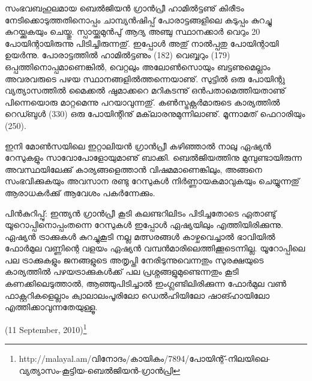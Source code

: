 സംഭവബഹുലമായ ബെല്‍ജിയന്‍ ഗ്രാന്‍പ്രീ ഹാമില്‍ട്ടണു് കിരീടം നേടിക്കൊടുത്തതിനൊപ്പം ചാമ്പ്യന്‍ഷിപ്പ് 
പോരാട്ടങ്ങളിലെ കടുപ്പം കുറച്ചു കുറയ്ക്കുകയും ചെയ്തു. സ്പായ്ക്കുമുന്‍പു് ആദ്യ അഞ്ചു സ്ഥാനക്കാര്‍ വെറും 20 പോയിന്റായിരുന്നു 
പിടിച്ചിരുന്നതു്. ഇപ്പോള്‍ അതു് നാല്‍പ്പതു പോയിന്റായി ഉയര്‍ന്നു. പോരാട്ടത്തില്‍ ഹാമില്‍ട്ടണും (182) വെബ്ബറും (179) 
ഒപ്പത്തിനൊപ്പമാണെങ്കില്‍, വെറ്റലും അലോണ്‍സൊയും ബട്ടണുമെല്ലാം അവരവരുടെ പഴയ സ്ഥാനങ്ങളില്‍ത്തന്നെയാണു്.
സുട്ടില്‍ ഒരു പോയിന്റു വ്യത്യാസത്തില്‍ മൈക്കല്‍ ഷുമാക്കറെ മറികടന്നു് ഒന്‍പതാമെത്തിയതാണു് പിന്നെയൊരു 
മാറ്റമെന്നു പറയാവുന്നതു്. കണ്‍സ്ട്രക്റ്റര്‍മാരുടെ കാര്യത്തില്‍ റെഡ്ബുള്‍ (330) ഒരു പോയിന്റിനു് മക്‌ലാരനുമുന്നിലാണു്. 
മൂന്നാമത് ഫെറാരിയും (250).

ഇനി മോണ്‍സയിലെ ഇറ്റാലിയന്‍ ഗ്രാന്‍പ്രീ കഴിഞ്ഞാല്‍ നാലു ഏഷ്യന്‍ റേസുകളും സാവോപോളോയുമാണു് ബാക്കി. 
ബെല്‍ജിയത്തിനു മുമ്പുണ്ടായിരുന്ന അവസ്ഥയിലേക്കു് കാര്യങ്ങളെത്താന്‍ വിഷമമാണെങ്കിലും, അങ്ങനെ 
സംഭവിക്കുകയും അവസാന രണ്ടു റേസുകള്‍ നിര്‍ണ്ണായകമാവുകയും ചെയ്യുന്നതു് ആരാധകര്‍ക്കു് ആവേശം 
പകര്‍ന്നേക്കും.

പിന്‍കുറിപ്പു്: ഇന്ത്യന്‍ ഗ്രാന്‍പ്രീ കൂടി കലണ്ടറിലിടം പിടിച്ചതോടെ ഏതാണ്ടു് യൂറൊപ്പിനൊപ്പംതന്നെ റേസുകള്‍ ഇപ്പോള്‍ 
ഏഷ്യയിലും എത്തിയിരിക്കുന്നു. ഏഷ്യന്‍ ട്രാക്കുകള്‍ കുറച്ചുകൂടി നല്ല മത്സരങ്ങള്‍ കാഴ്ചവെച്ചാല്‍ ഭാവിയില്‍ ഫോര്‍മുല 
വണ്ണിന്റെ വളയം ഏഷ്യന്‍ വമ്പന്‍മാരിലെത്തിക്കൂടെന്നില്ല. യൂറോപ്പിലെ പല ട്രാക്കുകളും ജനങ്ങളുടെ അതൃപ്തി 
നേരിടുന്നുവെന്നതും സുരക്ഷയുടെ കാര്യത്തില്‍ പഴയട്രാക്കുകള്‍ക്ക് പല പ്രശ്നങ്ങളുമുണ്ടെന്നതും കൂടി കണക്കിലെടുത്താല്‍,
ആഞ്ഞുപിടിച്ചാല്‍ ഇംഗ്ലണ്ടിലിരിക്കുന്ന ഫോര്‍മുല വണ്‍ ഫാക്റ്ററികളെല്ലാം ക്വാലാലംപൂരിലോ ഡെല്‍ഹിയിലോ 
ഷാങ്ഹായിലോ എത്തിക്കാവുന്നതേയുള്ളൂ.

\hspace*{2em}(11 September, 2010)\footnote{http://malayal.am/വിനോദം/കായികം/7894/പോയിന്റ്-നിലയിലെ-വ്യത്യാസം-കൂട്ടിയ-ബെല്‍ജിയന്‍-ഗ്രാന്‍പ്രി}

\newpage
